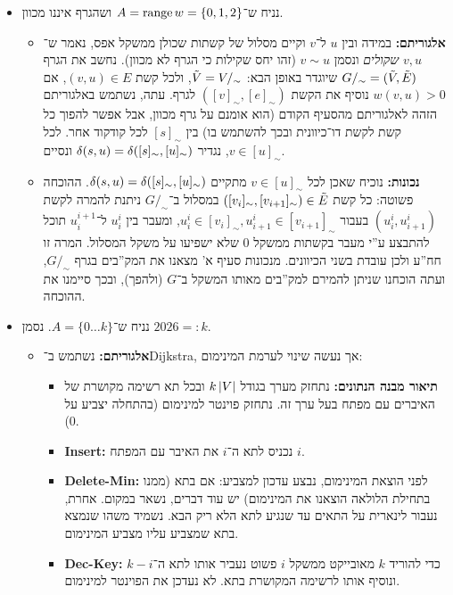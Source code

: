 \documentclass[]{../../../../tex/classes/homework}
\begin{document}
\begin{itemize}
\begin{itemize}
			עתה מנכונות BFS סיימנו; BFS שומר ב־$\dd$ את המסלול הקצר ביותר ב־$G'$, לכל $v \in V$, והראנו שמסלול קצר ביותר זה שווה בערכו למסלול הקל ביותר ב־$G$ המקורי. 
		\end{itemize}
		\item נניח ש־$A = \operatorname{range} w = \{0, 1, 2\}$ ושהגרף איננו מכוון. 
		\begin{itemize}
			\item \textbf{אלגוריתם: }במידה ובין $u$ ל־$v$ וקיים מסלול של קשתות שכולן ממשקל אפס, נאמר ש־$v, u$ \textit{שקולים} ונסמן $v \sim u$ (זהו יחס שקילות כי הגרף לא מכוון). נחשב את הגרף $G/_\sim = (\tilde V, \tilde E)$ שיוגדר באופן הבא: $\tilde V = V/_\sim$, ולכל קשת $(v, u) \in E$, אם $w(v, u) > 0$ נוסיף את הקשת $([v]_\sim, [e]_\sim)$ לגרף. עתה, נשתמש באלגוריתם הזהה לאלגוריתם מהסעיף הקודם (הוא אומנם על גרף מכוון, אבל אפשר להפוך כל קשת לקשת דו־כיוונית ובכך להשתמש בו) בין $[s]_\sim$ לכל קודקוד אחר. לכל $v \in [u]_\sim$, נגדיר $\delta(s, u) = \delta([s]_\sim, [u]_\sim)$ ונסיים. 
			\item \textbf{נכונות: }נוכיח שאכן לכל $v \in [u]_\sim$ מתקיים $\delta(s, u) = \delta([s]_\sim, [u]_\sim)$. ההוכחה פשוטה: כל קשת $([v_i]_\sim, [v_{i + 1}]_\sim) \in \tilde E$ במסלול ב־$G/_\sim$ ניתנת להמרה לקשת $(u^{i}_i, u^{i}_{i +1})$ בעבור $u^{i}_i \in [v_i]_{\sim}, u^{i}_{i + 1} \in [v_{i + 1}]_\sim$, ומעבר בין $u^{i}_{i}$ ל־$u^{i + 1}_{i}$ תוכל להתבצע ע''י מעבר בקשתות ממשקל $0$ שלא ישפיעו על משקל המסלול. המרה זו חח''ע ולכן עובדת בשני הכיוונים. מנכונות סעיף א' מצאנו את המק''בים בגרף $G/_\sim$, ועתה הוכחנו שניתן להמירם למק''בים מאותו המשקל ב־$G$ (ולהפך), ובכך סיימנו את ההוכחה. 
		\end{itemize}
		\item נניח ש־$A = \{0 \dots k\}$. נסמן $2026 =: k$. 
		\begin{itemize}
			\item \textbf{אלגוריתם: }נשתמש ב־Dijkstra, אך נעשה שינוי לערמת המינימום: 
			\begin{itemize}[*]
				\item \textbf{תיאור מבנה הנתונים: }נתחזק מערך בגודל $k \left \lvert V \right \rvert$ ובכל תא רשימה מקושרת של האיברים עם מפתח בעל ערך זה. נתחזק פוינטר למינימום (בהתחלה יצביע על 0). 
				\item \textbf{Insert: }נכניס לתא ה־$i$ את האיבר עם המפתח $i$. 
				\item \textbf{Delete-Min: }לפני הוצאת המינימום, נבצע עדכון למצביע: אם בתא (ממנו בתחילת הלולאה הוצאנו את המינימום) יש עוד דברים, נשאר במקום. אחרת, נעבור לינארית על התאים עד שנגיע לתא הלא ריק הבא. נשמיד משהו שנמצא בתא שמצביע עליו מצביע המינימום. 
				\item \textbf{Dec-Key: }כדי להוריד $k$ מאובייקט ממשקל $i$ פשוט נעביר אותו לתא ה־$k - i$ ונוסיף אותו לרשימה המקושרת בתא. לא נעדכן את הפוינטר למינימום. 

\end{itemize}
\end{itemize}
\end{itemize}
\end{document}
